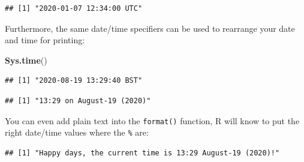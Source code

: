 \documentclass[
  12pt,
  krantz2]{krantz}
\makeatletter
\newenvironment{Shaded}{\begin{snugshade}}{\end{snugshade}}
\newcommand{\KeywordTok}[1]{\textcolor[rgb]{0.13,0.29,0.53}{\textbf{#1}}}
\newcommand{\NormalTok}[1]{#1}
\newcommand{\OperatorTok}[1]{\textcolor[rgb]{0.81,0.36,0.00}{\textbf{#1}}}
\newcommand{\StringTok}[1]{\textcolor[rgb]{0.31,0.60,0.02}{#1}}
\newenvironment{kframe}{%
\medskip{}
\setlength{\fboxsep}{.8em}
 \def\at@end@of@kframe{}%
 \ifinner\ifhmode%
  \def\at@end@of@kframe{\end{minipage}}%
  \begin{minipage}{\columnwidth}%
 \fi\fi%
 \def\FrameCommand##1{\hskip\@totalleftmargin \hskip-\fboxsep
 \colorbox{shadecolor}{##1}\hskip-\fboxsep
     \hskip-\linewidth \hskip-\@totalleftmargin \hskip\columnwidth}%
 \MakeFramed {\advance\hsize-\width
   \@totalleftmargin\z@ \linewidth\hsize
   \@setminipage}}%
 {\par\unskip\endMakeFramed%
 \at@end@of@kframe}
\renewenvironment{Shaded}{\begin{kframe}}{\end{kframe}}
\makeatother
\begin{document}
\begin{verbatim}
## [1] "2020-01-07 12:34:00 UTC"
\end{verbatim}

Furthermore, the same date/time specifiers can be used to rearrange your date and time for printing:

\begin{Shaded}
\begin{Highlighting}[]
\KeywordTok{Sys.time}\NormalTok{()}
\end{Highlighting}
\end{Shaded}

\begin{verbatim}
## [1] "2020-08-19 13:29:40 BST"
\end{verbatim}

\begin{Shaded}
\end{Shaded}

\begin{verbatim}
## [1] "13:29 on August-19 (2020)"
\end{verbatim}

You can even add plain text into the \texttt{format()} function, R will know to put the right date/time values where the \texttt{\%} are:

\begin{Shaded}
\end{Shaded}

\begin{verbatim}
## [1] "Happy days, the current time is 13:29 August-19 (2020)!"
\end{verbatim}

\begin{Shaded}
\end{Shaded}
\end{document}
